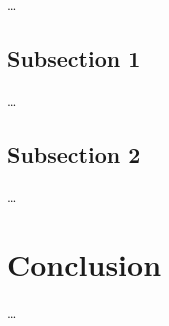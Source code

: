 \dots

\section{Subsection 1}
\label{ch:discussion:sec:subsection1}

\dots

\section{Subsection 2}
\label{ch:discussion:sec:subsection2}

\dots

\chapter{Conclusion}
\label{ch:conclusion}

\dots

